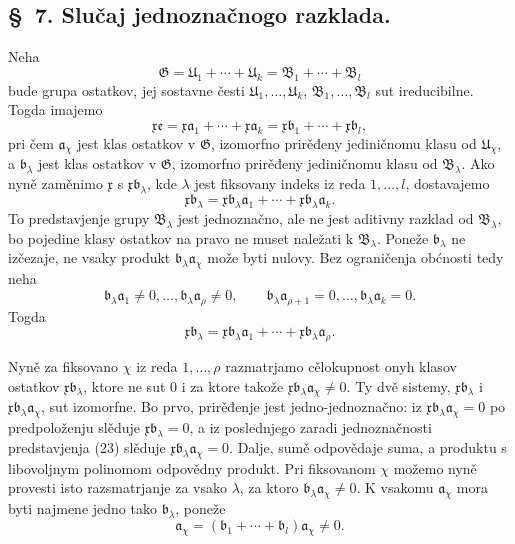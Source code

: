 \documentclass[11pt]{article}
\providecommand{\mG}{\mathfrak G}
\providecommand{\mU}{\mathfrak U}
\providecommand{\mB}{\mathfrak B}
\providecommand{\ma}{\mathfrak a}
\providecommand{\mb}{\mathfrak b}
\providecommand{\me}{\mathfrak e}
\providecommand{\mx}{\mathfrak x}
\begin{document}

\setcounter{footnote}{15}
\subsection*{\S~7. Slučaj jednoznačnogo razklada.}

Neha
\[
 \mG=\mU_1+\cdots+\mU_k=\mB_1+\cdots+\mB_l
\]
bude grupa ostatkov, jej sostavne česti \(\mU_1,\ldots,\mU_k\), \(\mB_1,\ldots,\mB_l\) sut ireducibilne. Togda imajemo
\begin{equation}
 \mx\me=\mx\ma_1+\cdots+\mx\ma_k
 =\mx\mb_1+\cdots+\mx\mb_l,
\tag{22}
\end{equation}
pri čem \(\ma_\chi\) jest klas ostatkov v \(\mG\), izomorfno prirěđeny jediničnomu klasu od \(\mU_\chi\), a \(\mb_\lambda\) jest klas ostatkov v \(\mG\), izomorfno prirěđeny jediničnomu klasu od \(\mB_\lambda\). Ako nyně zaměnimo \(\mx\) s \(\mx\mb_\lambda\), kde \(\lambda\) jest fiksovany indeks iz reda \(1,\ldots,l\), dostavajemo
\begin{equation}
 \mx\mb_\lambda=\mx\mb_\lambda\ma_1+\cdots+\mx\mb_\lambda\ma_k.
\tag{23}
\end{equation}
To predstavjenje grupy \(\mB_\lambda\) jest jednoznačno, ale ne jest aditivny razklad od \(\mB_\lambda\), bo pojedine klasy ostatkov na pravo ne muset naležati k \(\mB_\lambda\). Poneže \(\mb_\lambda\) ne izčezaje, ne vsaky produkt \(\mb_\lambda\ma_\chi\) može byti nulovy. Bez ograničenja obćnosti tedy neha
\[
 \mb_\lambda\ma_1\ne0,
 \ldots,
 \mb_\lambda\ma_\rho\ne0,
 \qquad
 \mb_\lambda\ma_{\rho+1}=0,
 \ldots,
 \mb_\lambda\ma_k=0.
\]
Togda
\[
 \mx\mb_\lambda=\mx\mb_\lambda\ma_1+\cdots+\mx\mb_\lambda\ma_\rho.
\]

Nyně za fiksovano \(\chi\) iz reda \(1,\ldots,\rho\) razmatrjamo cělokupnost onyh klasov ostatkov \(\mx\mb_\lambda\), ktore ne sut \(0\) i za ktore takože \(\mx\mb_\lambda\ma_\chi\ne0\). Ty dvě sistemy, \(\mx\mb_\lambda\) i \(\mx\mb_\lambda\ma_\chi\), sut izomorfne. Bo prvo, prirěđenje jest jedno-jednoznačno: iz \(\mx\mb_\lambda\ma_\chi=0\) po predpoloženju slěduje \(\mx\mb_\lambda=0\), a iz poslednjego zaradi jednoznačnosti predstavjenja (23) slěduje \(\mx\mb_\lambda\ma_\chi=0\). Dalje, sumě odpovědaje suma, a produktu s libovoljnym polinomom odpovědny produkt. Pri fiksovanom \(\chi\) možemo nyně provesti isto razsmatrjanje za vsako \(\lambda\), za ktoro \(\mb_\lambda\ma_\chi\ne0\). K vsakomu \(\ma_\chi\) mora byti najmene jedno tako \(\mb_\lambda\), poneže
\[
 \ma_\chi=(\mb_1+\cdots+\mb_l)\ma_\chi\ne0.
\]
\end{document}
